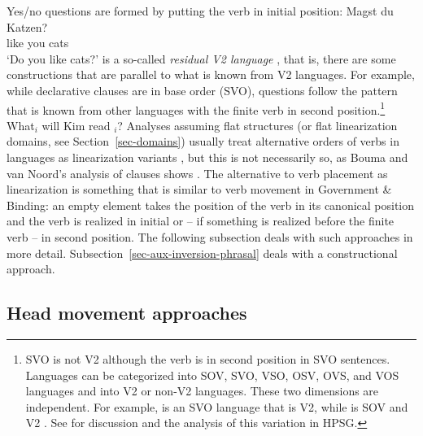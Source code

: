 \documentclass[output=paper,biblatex,babelshorthands,newtxmath,draftmode,colorlinks,citecolor=brown]{langscibook}
\begin{document}
Yes/no questions are formed by putting the verb in initial position:
\ea
\gll Magst du Katzen?\\
     like  you cats\\
\glt `Do you like cats?'
\z
{} is a so-called \emph{residual V2 language} \citep{Rizzi1990a-u}, that is, there are
some constructions that are parallel to what is known from V2 languages.
For example, while declarative clauses are in base order (SVO), questions follow the pattern that is
known from other  languages with the finite verb in second position.\footnote{%
  SVO is not V2 although the verb is in second position in SVO sentences. Languages can be
  categorized into SOV, SVO, VSO, OSV, OVS, and VOS languages and into V2 or non-V2 languages. These two
  dimensions are independent. For example,  is an SVO language that is V2, while  is SOV
  and V2 \citep{Haftka96a,Haider2020a}. See  for discussion and the analysis of this variation in HPSG.
}
\ea
What$_i$ will Kim read \trace$_i$? 
\z
Analyses assuming flat structures (or flat linearization domains, see Section~\ref{sec-domains})
usually treat alternative orders of verbs in  languages as linearization variants
\citep{Reape94a,Kathol2001a,Mueller95c,Mueller2003a,TBjerre2006a}, but this is not necessarily so, as
Bouma and van Noord's analysis of  clauses shows \citep[, 71]{BvN98a}. The alternative to
verb placement as linearization is something that is similar to verb movement in Government \&
Binding\indexgb: an empty element takes the position of the verb in its canonical position and the verb is realized
in initial or -- if something is realized before the finite verb -- in second position. The following subsection deals with such approaches in more
detail. Subsection~\ref{sec-aux-inversion-phrasal} deals with a constructional approach.

\subsection{Head movement approaches}
\label{sec-head-movement}
\end{document}
